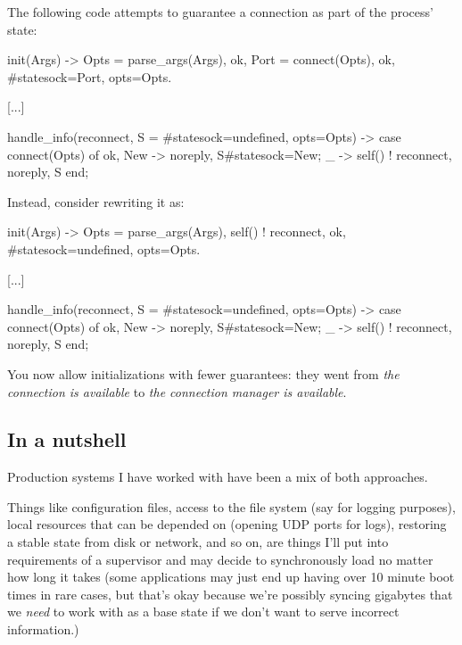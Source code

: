The following code attempts to guarantee a connection as part of the process' state:

\begin{VerbatimText}
init(Args) ->
    Opts = parse_args(Args),
    {ok, Port} = connect(Opts),
    {ok, #state{sock=Port, opts=Opts}}.

[...]

handle_info(reconnect, S = #state{sock=undefined, opts=Opts}) ->
    case connect(Opts) of
        {ok, New} -> {noreply, S#state{sock=New}};
         _ -> self() ! reconnect, {noreply, S}
    end;
\end{VerbatimText}

Instead, consider rewriting it as:

\begin{VerbatimText}
init(Args) ->
    Opts = parse_args(Args),
    self() ! reconnect,
    {ok, #state{sock=undefined, opts=Opts}}.

[...]

handle_info(reconnect, S = #state{sock=undefined, opts=Opts}) ->
    case connect(Opts) of
        {ok, New} -> {noreply, S#state{sock=New}};
        _ -> self() ! reconnect, {noreply, S}
    end;
\end{VerbatimText}

You now allow initializations with fewer guarantees: they went from \emph{the connection is available} to \emph{the connection manager is available}.

\subsection{In a nutshell}
\label{subsec:start-link-in-a-nutshell}

Production systems I have worked with have been a mix of both approaches.

Things like configuration files, access to the file system (say for logging purposes), local resources that can be depended on (opening UDP ports for logs), restoring a stable state from disk or network, and so on, are things I'll put into requirements of a supervisor and may decide to synchronously load no matter how long it takes (some applications may just end up having over 10 minute boot times in rare cases, but that's okay because we're possibly syncing gigabytes that we \emph{need} to work with as a base state if we don't want to serve incorrect information.)

